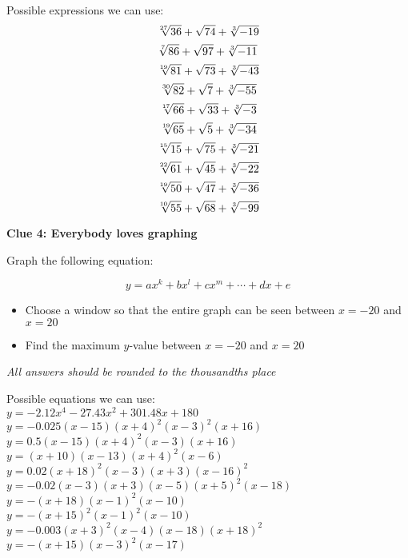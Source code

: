 \documentclass[11pt]{scrartcl}
\theoremstyle{definition}
\begin{document}
\vspace{5cm}
\noindent
Possible expressions we can use:\\[4mm]

\noindent
\[\sqrt[27]{36}+\sqrt{74}+\sqrt[3]{-19}\\[4mm]\]
\[\sqrt[7]{86}+\sqrt{97}+\sqrt[3]{-11}\\[4mm]\]
\[\sqrt[19]{81}+\sqrt{73}+\sqrt[3]{-43}\\[4mm]\]
\[\sqrt[30]{82}+\sqrt{7}+\sqrt[3]{-55}\\[4mm]\]
\[\sqrt[17]{66}+\sqrt{33}+\sqrt[3]{-3}\\[4mm]\]
\[\sqrt[19]{65}+\sqrt{5}+\sqrt[3]{-34}\\[4mm]\]
\[\sqrt[15]{15}+\sqrt{75}+\sqrt[3]{-21}\\[4mm]\]
\[\sqrt[22]{61}+\sqrt{45}+\sqrt[3]{-22}\\[4mm]\]
\[\sqrt[19]{50}+\sqrt{47}+\sqrt[3]{-36}\\[4mm]\]
\[\sqrt[10]{55}+\sqrt{68}+\sqrt[3]{-99}\\[4mm]\]


\newpage

\begin{center}
	\textbf{Clue 4: Everybody loves graphing}
\end{center}

\noindent
Graph the following equation:

\vspace{1cm}

\[y=ax^k+bx^l+cx^m+\cdots+dx+e\]

\vspace{2cm}

\begin{itemize}
	\item Choose a window so that the entire graph can be seen between $x=-20$ and $x=20$
	\item Find the maximum $y$-value between $x=-20$ and $x=20$
\end{itemize}

\vspace{2cm}
\textit{All answers should be rounded to the thousandths place}

\vspace{4cm}
\noindent
Possible equations we can use:\\[4mm]
\noindent
$y=-2.12x^4-27.43x^2+301.48x+180$\\[4mm]
$y=-0.025(x-15)(x+4)^2(x-3)^2(x+16)$\\[4mm]
$y=0.5(x-15)(x+4)^2(x-3)(x+16)$\\[4mm]
$y=(x+10)(x-13)(x+4)^2(x-6)$\\[4mm]
$y=0.02(x+18)^2(x-3)(x+3)(x-16)^2$\\[4mm]
$y=-0.02(x-3)(x+3)(x-5)(x+5)^2(x-18)$\\[4mm]
$y=-(x+18)(x-1)^2(x-10)$\\[4mm]
$y=-(x+15)^2(x-1)^2(x-10)$\\[4mm]
$y=-0.003(x+3)^2(x-4)(x-18)(x+18)^2$\\[4mm]
$y=-(x+15)(x-3)^2(x-17)$\\[4mm]
\end{document}
